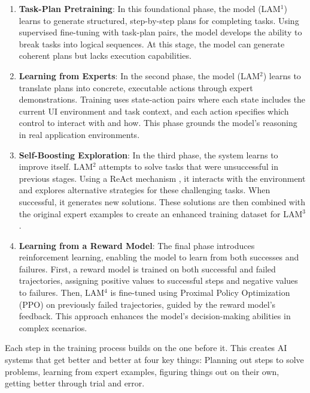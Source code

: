 \documentclass[journal,twoside,10pt]{IEEEtran}
\begin{document}
\begin{enumerate}
    \item \textbf{Task-Plan Pretraining}: In this foundational phase, the model (LAM$^1$) learns to generate structured, step-by-step plans for completing tasks. Using supervised fine-tuning with task-plan pairs, the model develops the ability to break tasks into logical sequences. At this stage, the model can generate coherent plans but lacks execution capabilities.
    
    \item \textbf{Learning from Experts}: In the second phase, the model (LAM$^2$) learns to translate plans into concrete, executable actions through expert demonstrations. Training uses state-action pairs where each state includes the current UI environment and task context, and each action specifies which control to interact with and how. This phase grounds the model's reasoning in real application environments.
    
    \item \textbf{Self-Boosting Exploration}: In the third phase, the system learns to improve itself. LAM$^2$ attempts to solve tasks that were unsuccessful in previous stages. Using a ReAct mechanism \cite{yao2022react}, it interacts with the environment and explores alternative strategies for these challenging tasks. When successful, it generates new solutions. These solutions are then combined with the original expert examples to create an enhanced training dataset for LAM$^3$.
    
    \item \textbf{Learning from a Reward Model}: The final phase introduces reinforcement learning, enabling the model to learn from both successes and failures. First, a reward model is trained on both successful and failed trajectories, assigning positive values to successful steps and negative values to failures. Then, LAM$^4$ is fine-tuned using Proximal Policy Optimization (PPO) on previously failed trajectories, guided by the reward model's feedback. This approach enhances the model's decision-making abilities in complex scenarios.
\end{enumerate}

Each step in the training process builds on the one before it. This creates AI systems that get better and better at four key things: Planning out steps to solve problems, learning from expert examples, figuring things out on their own, getting better through trial and error.
\end{document}

